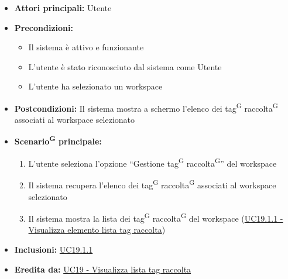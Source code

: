 \documentclass[a4paper, 11pt]{article}
\begin{document}
\begin{itemize}
	\item \textbf{Attori principali:} Utente
	\item \textbf{Precondizioni:}
	\begin{itemize}
		\item Il sistema è attivo e funzionante
		\item L'utente è stato riconosciuto dal sistema come Utente
		\item L'utente ha selezionato un workspace
	\end{itemize}
	\item \textbf{Postcondizioni:} Il sistema mostra a schermo l'elenco dei tag\textsuperscript{G} raccolta\textsuperscript{G} associati al workspace selezionato
	\item \textbf{Scenario\textsuperscript{G} principale:}
	\begin{enumerate}
		\item L'utente seleziona l'opzione “Gestione tag\textsuperscript{G} raccolta\textsuperscript{G}” del workspace
		\item Il sistema recupera l'elenco dei tag\textsuperscript{G} raccolta\textsuperscript{G} associati al workspace selezionato
		\item Il sistema mostra la lista dei tag\textsuperscript{G} raccolta\textsuperscript{G} del workspace (\hyperref[UC19.1.1]{UC19.1.1 - Visualizza elemento lista tag raccolta})
	\end{enumerate}
	\item \textbf{Inclusioni:} \hyperref[UC19.1.1]{UC19.1.1}
	\item \textbf{Eredita da:} \hyperref[UC19]{UC19 - Visualizza lista tag raccolta}
\end{itemize}
\end{document}

